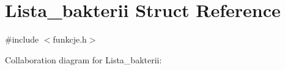 \hypertarget{structLista__bakterii}{}\section{Lista\+\_\+bakterii Struct Reference}
\label{structLista__bakterii}


{\ttfamily \#include $<$funkcje.\+h$>$}



Collaboration diagram for Lista\+\_\+bakterii\+:
